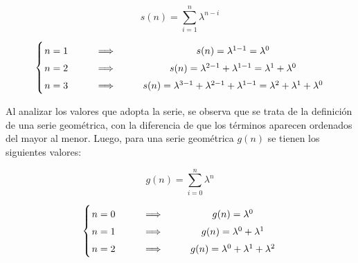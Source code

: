 \begin{equation}
s(n) = \sum_{i=1}^n \lambda^{n-i}
\end{equation}

\begin{equation*}
   \arraycolsep=1.0pt\def\arraystretch{1.5}
   \left\{
   \begin{array}{lc}
      n = 1 \hspace{1cm} \Longrightarrow \hspace{1cm} & s(n) = \lambda^{1-1} = \lambda^0 \\
      n = 2 \hspace{1cm} \Longrightarrow \hspace{1cm} & s(n) = \lambda^{2-1} + \lambda^{1-1} = \lambda^1 + \lambda^0 \\
      n = 3 \hspace{1cm} \Longrightarrow \hspace{1cm} & s(n) = \lambda^{3-1} + \lambda^{2-1} + \lambda^{1-1} = \lambda^2 + \lambda^1 + \lambda^0
   \end{array} \right.
\end{equation*}

Al analizar los valores que adopta la serie, se observa que se trata de la definición de una serie geométrica, con la diferencia de que los términos aparecen ordenados del mayor al menor. Luego, para una serie geométrica $g(n)$ se tienen los siguientes valores:

\begin{equation}
g(n) = \sum_{i=0}^n \lambda^{n}
\end{equation}

\begin{equation*}
   \arraycolsep=1.0pt\def\arraystretch{1.5}
   \left\{
   \begin{array}{lc}
      n = 0 \hspace{1cm} \Longrightarrow \hspace{1cm} & g(n) = \lambda^0 \\
      n = 1 \hspace{1cm} \Longrightarrow \hspace{1cm} & g(n) = \lambda^0 + \lambda^1 \\
      n = 2 \hspace{1cm} \Longrightarrow \hspace{1cm} & g(n) = \lambda^0 + \lambda^1 + \lambda^2
   \end{array} \right.
\end{equation*}

